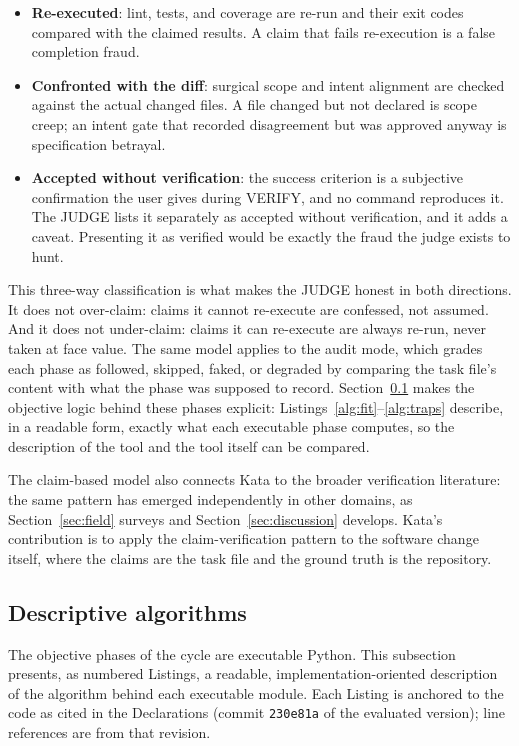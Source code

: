 \documentclass[11pt]{article}
\begin{document}
\begin{itemize}
\item \textbf{Re-executed}: lint, tests, and coverage are re-run and their
exit codes compared with the claimed results. A claim that fails
re-execution is a false completion fraud.
\item \textbf{Confronted with the diff}: surgical scope and intent
alignment are checked against the actual changed files. A file changed but
not declared is scope creep; an intent gate that recorded disagreement but
was approved anyway is specification betrayal.
\item \textbf{Accepted without verification}: the success criterion is a
subjective confirmation the user gives during VERIFY, and no command
reproduces it. The JUDGE lists it separately as accepted without
verification, and it adds a caveat. Presenting it as verified would be
exactly the fraud the judge exists to hunt.
\end{itemize}

This three-way classification is what makes the JUDGE honest in both
directions. It does not over-claim: claims it cannot re-execute are
confessed, not assumed. And it does not under-claim: claims it can
re-execute are always re-run, never taken at face value. The same model
applies to the audit mode, which grades each phase as followed, skipped,
faked, or degraded by comparing the task file's content with what the phase was
supposed to record. Section~\ref{sec:algorithms} makes the objective
logic behind these phases explicit: Listings~\ref{alg:fit}--\ref{alg:traps}
describe, in a readable form, exactly what each executable phase computes,
so the description of the tool and the tool itself can be compared.

The claim-based model also connects Kata to the broader verification
literature: the same pattern has emerged independently in other domains, as
Section~\ref{sec:field} surveys and Section~\ref{sec:discussion} develops.
Kata's contribution is
to apply the claim-verification pattern to the software change itself,
where the claims are the task file and the ground truth is the repository.

\subsection{Descriptive algorithms}
\label{sec:algorithms}

The objective phases of the cycle are executable Python. This subsection
presents, as numbered Listings, a readable, implementation-oriented
description of the algorithm behind each executable module. Each Listing
is anchored to the code as cited in the Declarations (commit
\texttt{230e81a} of the evaluated version); line references
are from that revision.
\end{document}
